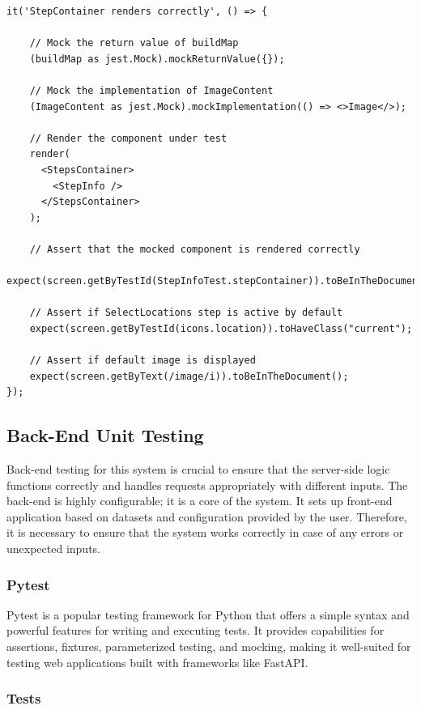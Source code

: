 \begin{lstlisting}[caption={Unit test for rendering the StepContainer component.}, label={lst:jestTest}]
it('StepContainer renders correctly', () => {

    // Mock the return value of buildMap
    (buildMap as jest.Mock).mockReturnValue({});

    // Mock the implementation of ImageContent
    (ImageContent as jest.Mock).mockImplementation(() => <>Image</>);

    // Render the component under test
    render(
      <StepsContainer>
        <StepInfo />
      </StepsContainer>
    );

    // Assert that the mocked component is rendered correctly
    expect(screen.getByTestId(StepInfoTest.stepContainer)).toBeInTheDocument();

    // Assert if SelectLocations step is active by default
    expect(screen.getByTestId(icons.location)).toHaveClass("current");

    // Assert if default image is displayed
    expect(screen.getByText(/image/i)).toBeInTheDocument();
});
\end{lstlisting}

\subsection{Back-End Unit Testing}

Back-end testing for this system is crucial to ensure that the server-side logic functions correctly and handles requests appropriately with different inputs. The back-end is highly configurable; it is a core of the system. It sets up front-end application based on datasets and configuration provided by the user. Therefore, it is necessary to ensure that the system works correctly in case of any errors or unexpected inputs.

\subsubsection{Pytest}

Pytest is a popular testing framework for Python that offers a simple syntax and powerful features for writing and executing tests. It provides capabilities for assertions, fixtures, parameterized testing, and mocking, making it well-suited for testing web applications built with frameworks like FastAPI.

\subsubsection{Tests}


